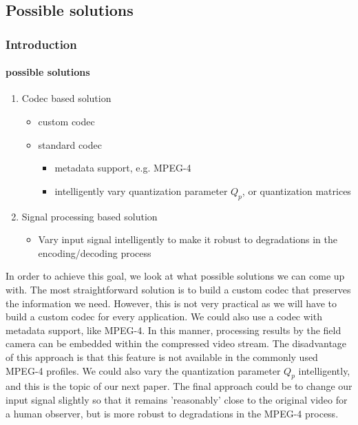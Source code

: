 \subsection{Possible solutions}
\begin{frame}
\frametitle{Introduction}
\framesubtitle{possible solutions}
\logoCSIPCPL\mypagenum
{}
{
	\begin{enumerate}
		\item Codec based solution
			\begin{itemize}
				\item custom codec
				\item standard codec
					\begin{itemize}
						\item metadata support, e.g. MPEG-4
						\item intelligently vary quantization parameter $Q_p$, or quantization matrices
					\end{itemize}
			\end{itemize}
		\item Signal processing based solution
			\begin{itemize}
				\item Vary input signal intelligently to make it robust to degradations in the encoding/decoding process
			\end{itemize}
	\end{enumerate}
}
{
In order to achieve this goal, we look at what possible solutions we can come up with.  The most straightforward solution is to build a custom codec that preserves the information we need.  However, this is not very practical as we will have to build a custom codec for every application.  We could also use a codec with metadata support, like MPEG-4.  In this manner, processing results by the field camera can be embedded within the compressed video stream.  The disadvantage of this approach is that this feature is not available in the commonly used MPEG-4 profiles.  We could also vary the quantization parameter $Q_p$ intelligently, and this is the topic of our next paper.  The final approach could be to change our input signal slightly so that it remains 'reasonably' close to the original video for a human observer, but is more robust to degradations in the MPEG-4 process.
}
\end{frame}



